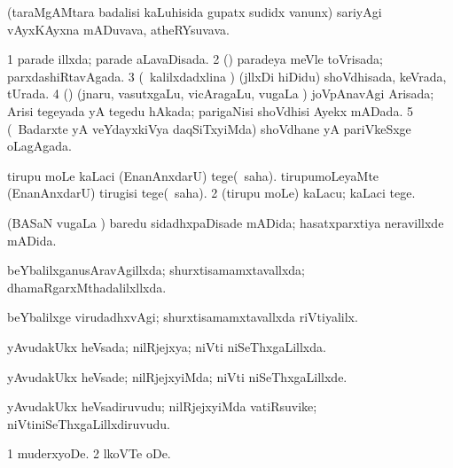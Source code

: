 {{\bentry
{} 
\gl{\nA}
\expl{}
\bmng
(taraMgAMtara badalisi kaLuhisida gupatx sudidx \mo vanunx) sariyAgi vAyxKAyxna mADuvava, atheRYsuvava. 
\emng
\eentry

\bentry
{} 
\gl{\gu}
\expl{}
\bmng
\bnum
\num{1} parade illxda; parade aLavaDisada. 
\num{2} (\caci) paradeya meVle toVrisada; parxdashiRtavAgada. 
\num{3} (\kanmu\ kalilxdadxlina \vi) (jllxDi hiDidu) shoVdhisada, keVrada, tUrada. 
\num{4} (\rUpa) (jnaru, vasutxgaLu, vicAragaLu, \mo vugaLa \vi) joVpAnavAgi Arisada; Arisi tegeyada yA tegedu hAkada; parigaNisi shoVdhisi Ayekx mADada. 
\num{5} (\kanmu\ Badarxte yA veYdayxkiVya daqSiTxyiMda) shoVdhane yA pariVkeSxge oLagAgada. 
\enum
\emng
\eentry

\bentry
{} 
\gl{\sakirx}
\expl{}
\bmng
\bnum
{} 
\banum
{} tirupu moLe kaLaci (EnanAnxdarU) tege(\akirx\ saha). 
 tirupumoLeyaMte (EnanAnxdarU) tirugisi tege(\akirx\ saha). 
\eanum
\numie
\num{2} (tirupu moLe) kaLacu; kaLaci tege. 
\enum
\emng
\eentry

\bentry
{} 
\gl{\gu}
\expl{}
\bmng
(BASaN \mo vugaLa \vi) baredu sidadhxpaDisade mADida; hasatxparxtiya neravillxde mADida. 
\emng
\eentry

\bentry
{} 
\gl{\gu}
\expl{}
\bmng
beYbalilxganusAravAgillxda; shurxtisamamxtavallxda; dhamaRgarxMthadalilxllxda. 
\emng
\eentry

\bentry
{} 
\gl{\kirxvi}
\expl{}
\bmng
beYbalilxge virudadhxvAgi; shurxtisamamxtavallxda riVtiyalilx. 
\emng
\eentry

\bentry
{} 
\gl{\gu}
\expl{}
\bmng
yAvudakUkx heVsada; nilRjejxya; niVti niSeThxgaLillxda. 
\emng
\eentry

\bentry
{} 
\gl{\kirxvi}
\expl{}
\bmng
yAvudakUkx heVsade; nilRjejxyiMda; niVti niSeThxgaLillxde. 
\emng
\eentry

\bentry
{} 
\gl{\nA}
\expl{}
\bmng
yAvudakUkx heVsadiruvudu; nilRjejxyiMda vatiRsuvike; niVtiniSeThxgaLillxdiruvudu. 
\emng
\eentry

\bentry
{} 
\gl{\sakirx}
\expl{}
\bmng
\bnum
\num{1} muderxyoDe. 
\num{2} lkoVTe oDe. 
\enum
\emng
\eentry

}}
